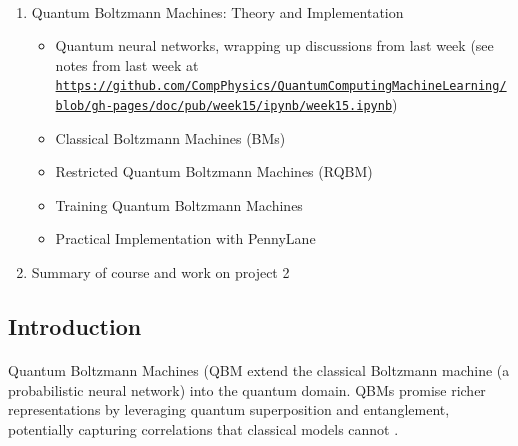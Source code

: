 \documentclass[%
oneside,                 %
final,                   %
10pt]{article}
\begin{document}
\paragraph{}
\begin{enumerate}
\item Quantum Boltzmann Machines: Theory and Implementation
\begin{itemize}

  \item Quantum neural networks, wrapping up discussions from last week (see notes from last week at \href{{https://github.com/CompPhysics/QuantumComputingMachineLearning/blob/gh-pages/doc/pub/week15/ipynb/week15.ipynb}}{\nolinkurl{https://github.com/CompPhysics/QuantumComputingMachineLearning/blob/gh-pages/doc/pub/week15/ipynb/week15.ipynb}})

  \item Classical Boltzmann  Machines (BMs)

  \item Restricted Quantum Boltzmann Machines (RQBM)

  \item Training Quantum Boltzmann Machines

  \item Practical Implementation with PennyLane

\end{itemize}

\noindent
\item Summary of course and work on  project 2
\end{enumerate}

\noindent



\subsection{Introduction}


\paragraph{}
Quantum Boltzmann Machines (QBM extend the
classical Boltzmann machine (a probabilistic neural network) into the
quantum domain. QBMs promise richer representations by leveraging
quantum superposition and entanglement, potentially capturing
correlations that classical models cannot .
\end{document}

